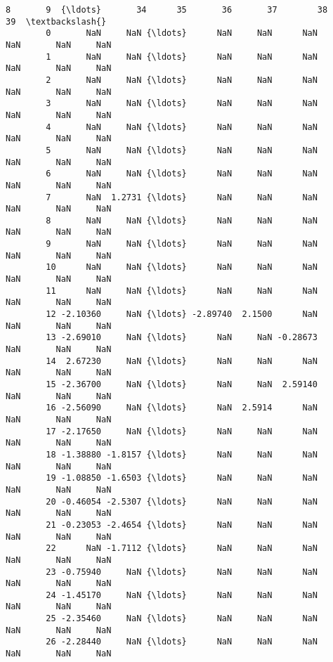 \documentclass[11pt]{article}
\begin{document}
\begin{Verbatim}[commandchars=\\\{\}]
                 8       9  {\ldots}       34      35       36       37        38      39  \textbackslash{}
        0       NaN     NaN {\ldots}      NaN     NaN      NaN      NaN       NaN     NaN   
        1       NaN     NaN {\ldots}      NaN     NaN      NaN      NaN       NaN     NaN   
        2       NaN     NaN {\ldots}      NaN     NaN      NaN      NaN       NaN     NaN   
        3       NaN     NaN {\ldots}      NaN     NaN      NaN      NaN       NaN     NaN   
        4       NaN     NaN {\ldots}      NaN     NaN      NaN      NaN       NaN     NaN   
        5       NaN     NaN {\ldots}      NaN     NaN      NaN      NaN       NaN     NaN   
        6       NaN     NaN {\ldots}      NaN     NaN      NaN      NaN       NaN     NaN   
        7       NaN  1.2731 {\ldots}      NaN     NaN      NaN      NaN       NaN     NaN   
        8       NaN     NaN {\ldots}      NaN     NaN      NaN      NaN       NaN     NaN   
        9       NaN     NaN {\ldots}      NaN     NaN      NaN      NaN       NaN     NaN   
        10      NaN     NaN {\ldots}      NaN     NaN      NaN      NaN       NaN     NaN   
        11      NaN     NaN {\ldots}      NaN     NaN      NaN      NaN       NaN     NaN   
        12 -2.10360     NaN {\ldots} -2.89740  2.1500      NaN      NaN       NaN     NaN   
        13 -2.69010     NaN {\ldots}      NaN     NaN -0.28673      NaN       NaN     NaN   
        14  2.67230     NaN {\ldots}      NaN     NaN      NaN      NaN       NaN     NaN   
        15 -2.36700     NaN {\ldots}      NaN     NaN  2.59140      NaN       NaN     NaN   
        16 -2.56090     NaN {\ldots}      NaN  2.5914      NaN      NaN       NaN     NaN   
        17 -2.17650     NaN {\ldots}      NaN     NaN      NaN      NaN       NaN     NaN   
        18 -1.38880 -1.8157 {\ldots}      NaN     NaN      NaN      NaN       NaN     NaN   
        19 -1.08850 -1.6503 {\ldots}      NaN     NaN      NaN      NaN       NaN     NaN   
        20 -0.46054 -2.5307 {\ldots}      NaN     NaN      NaN      NaN       NaN     NaN   
        21 -0.23053 -2.4654 {\ldots}      NaN     NaN      NaN      NaN       NaN     NaN   
        22      NaN -1.7112 {\ldots}      NaN     NaN      NaN      NaN       NaN     NaN   
        23 -0.75940     NaN {\ldots}      NaN     NaN      NaN      NaN       NaN     NaN   
        24 -1.45170     NaN {\ldots}      NaN     NaN      NaN      NaN       NaN     NaN   
        25 -2.35460     NaN {\ldots}      NaN     NaN      NaN      NaN       NaN     NaN   
        26 -2.28440     NaN {\ldots}      NaN     NaN      NaN      NaN       NaN     NaN   

\end{Verbatim}
\end{document}
